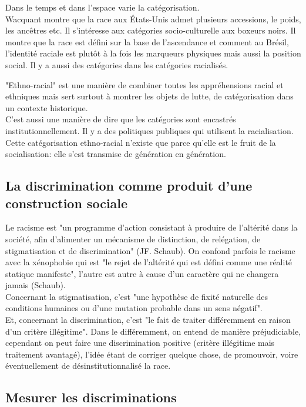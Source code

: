 \documentclass[10pt, a4paper, openany]{book}
\begin{document}
Dans le temps et dans l'espace varie la catégorisation. \\
Wacquant montre que la race aux États-Unis admet plusieurs accessions, le poids, les ancêtres etc. Il s'intéresse aux catégories socio-culturelle aux boxeurs noirs. Il montre que la race est défini sur la base de l'ascendance et comment au Brésil, l'identité raciale est plutôt à la fois les marqueurs physiques mais aussi la position social. Il y a aussi des catégories dans les catégories racialisés.


"Ethno-racial" est une manière de combiner toutes les appréhensions racial et ethniques mais sert surtout à montrer les objets de lutte, de catégorisation dans un contexte historique. \\
C'est aussi une manière de dire que les catégories sont encastrés institutionnellement. Il y a des politiques publiques qui utilisent la racialisation. \\
Cette catégorisation ethno-racial n'existe que parce qu'elle est le fruit de la socialisation: elle s'est transmise de génération en génération.


\subsection{La discrimination comme produit d'une construction sociale}

Le racisme est "un programme d'action consistant à produire de l'altérité dans la société, afin d'alimenter un mécanisme de distinction, de relégation, de stigmatisation et de discrimination" (JF. Schaub). On confond parfois le racisme avec la xénophobie qui est "le rejet de l'altérité qui est défini comme une réalité statique manifeste", l'autre est autre à cause d'un caractère qui ne changera jamais (Schaub). \\
Concernant la stigmatisation, c'est "une hypothèse de fixité naturelle des conditions humaines ou d'une mutation probable dans un sens négatif". \\
Et, concernant la discrimination, c'est "le fait de traiter différemment en raison d'un critère illégitime". Dans le différemment, on entend de manière préjudiciable, cependant on peut faire une discrimination positive (critère illégitime mais traitement avantagé), l'idée étant de corriger quelque chose, de promouvoir, voire éventuellement de désinstitutionnalisé la race.


\subsection{Mesurer les discriminations}
\end{document}
